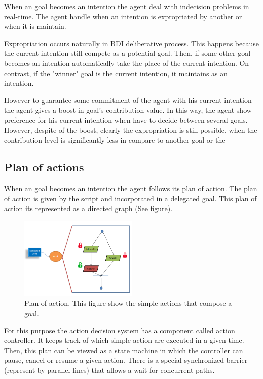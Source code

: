 When an goal becomes an intention the agent deal with indecision problems in real-time. The agent handle when an intention is expropriated by another or when it is maintain.

Expropriation occurs naturally in BDI deliberative process. This happens because the current intention still compete as a potential goal. Then, if some other goal becomes an intention automatically take the place of the current intention. On contrast, if the "winner" goal is the current intention, it maintains as an intention.

However to guarantee some commitment of the agent with his current intention the agent gives a boost in goal's contribution value. In this way, the agent show preference for his current intention when have to decide between several goals. However, despite of the boost, clearly the expropriation is still possible, when the contribution level  is significantly less in compare to another goal or the 


\subsection{Plan of actions}
When an goal becomes an intention the agent follows its plan of action. The plan of action is given by the script and incorporated in a delegated goal. This plan of action its represented as a directed graph (See figure).

\begin{figure}
	\centering
	\includegraphics[width=0.5\textwidth]{Images/PlanOfAction.png} 
	\caption{Plan of action. This figure show the simple actions that compose a goal.}
	\label{fig:GoalManager}
\end{figure}

For this purpose the action decision system has a component called action controller. It keeps track of which simple action are executed in a given time.  Then, this plan can be viewed as a state machine in which the controller can pause, cancel or resume a given action. There is a special synchronized barrier (represent by parallel lines) that allows a wait for concurrent paths.

